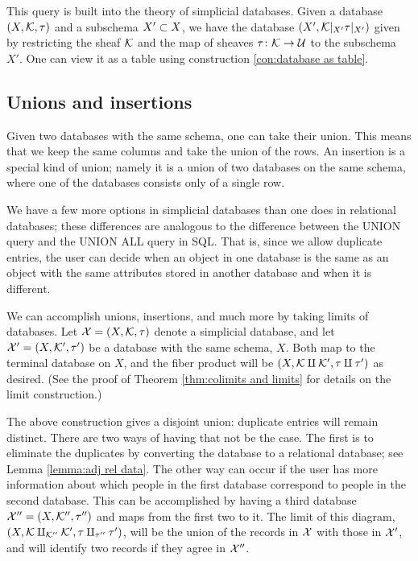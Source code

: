 \documentclass{amsart}
\begin{document}
This query is built into the theory of simplicial databases.  Given a database $(X,\mcK,\tau)$ and a subschema $X'\ss X$, we have the database $(X',\mcK|_{X'}\tau|_{X'})$ given by restricting the sheaf $\mcK$ and the map of sheaves $\tau\taking\mcK\to\mcU$ to the subschema $X'$.  One can view it as a table using construction \ref{con:database as table}.

\subsection{Unions and insertions}

Given two databases with the same schema, one can take their union.  This means that we keep the same columns and take the union of the rows.  An insertion is a special kind of union; namely it is a union of two databases on the same schema, where one of the databases consists only of a single row.

We have a few more options in simplicial databases than one does in relational databases; these differences are analogous to the difference between the UNION query and the UNION ALL query in SQL.  That is, since we allow duplicate entries, the user can decide when an object in one database is the same as an object with the same attributes stored in another database and when it is different.  

We can accomplish unions, insertions, and much more by taking limits of databases.  Let $\mcX=(X,\mcK,\tau)$ denote a simplicial database, and let $\mcX'=(X,\mcK',\tau')$ be a database with the same schema, $X$.  Both map to the terminal database on $X$, and the fiber product will be $(X,\mcK\amalg\mcK',\tau\amalg\tau')$ as desired.  (See the proof of Theorem \ref{thm:colimits and limits} for details on the limit construction.)

The above construction gives a disjoint union: duplicate entries will remain distinct.  There are two ways of having that not be the case.  The first is to eliminate the duplicates by converting the database to a relational database; see Lemma \ref{lemma:adj rel data}.  The other way can occur if the user has more information about which people in the first database correspond to people in the second database.  This can be accomplished by having a third database $\mcX''=(X,\mcK'',\tau'')$ and maps from the first two to it.  The limit of this diagram, $(X,\mcK\amalg_{\mcK''}\mcK',\tau\amalg_{\tau''}\tau')$, will be the union of the records in $\mcX$ with those in $\mcX'$, and will identify two records if they agree in $\mcX''$.
\end{document}
